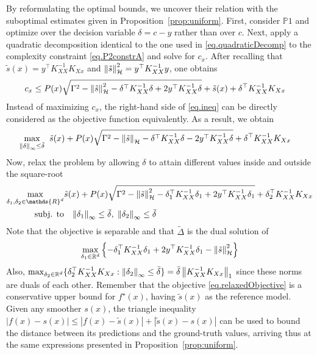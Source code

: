 By reformulating the optimal bounds, we uncover their relation with the suboptimal estimates given in Proposition~\ref{prop:uniform}. First, consider $\mathds{P}1$ and optimize over the decision variable $\delta = c - y$ rather than over $c$. Next, apply a quadratic decomposition identical to the one used in \eqref{eq.quadraticDecomp} to the complexity constraint \eqref{eq.P2constrA} and solve for $c_x$. After recalling that $\tilde{s}(x) = y^\top K_{XX}^{-1} K_{Xx}$ and $\left\| \tilde s \right\|_\mathcal{H}^2 = y^\top K_{XX}^{-1} y$, one obtains
\begin{equation}
	\begin{aligned}
		c_x  \leq \;&  P(x) \sqrt{ \Gamma^2 - \left\| \tilde s \right\|_\mathcal{H}^2 - \delta^\top K_{XX}^{-1}\delta +2y^\top K_{XX}^{-1}\delta} +\tilde s(x) 
		+ \delta^\top K_{XX}^{-1}K_{Xx}
	\end{aligned}	
	\label{eq.ineq}
\end{equation}
Instead of maximizing $c_x$, the right-hand side of \eqref{eq.ineq} can be directly considered as the objective function equivalently. As a result, we obtain 
\[
\begin{aligned}
	\max_{\left\| \delta \right\|_\infty \leq \bar \delta}\;\;& \tilde s(x) + P(x) \sqrt{ \Gamma^2 - \left\| \tilde s \right\|_\mathcal{H} - \delta^\top K_{XX}^{-1}\delta -2y^\top K_{XX}^{-1}\delta} + \delta^\top K_{XX}^{-1}K_{Xx} 
\end{aligned}
\]
Now, relax the problem by allowing $\delta$ to attain different values inside and outside the square-root
\begin{subequations}
	\begin{align}\notag
		\max_{\delta_1,\delta_2 \in \mathds{R}^{d}} &  \tilde s(x) + P(x) \sqrt{ \Gamma^2 - \rknorm{\tilde s}^2 - \delta_1^\top K_{XX}^{-1}\delta_1 +2y^\top K_{XX}^{-1}\delta_1} + \delta_2^\top K_{XX}^{-1}K_{Xx} \\ \label{eq.relaxedObjective}
		\text{\normalfont subj. to} & \;\; \; \infnorm{\delta_1} \leq \bar \delta, \; \infnorm{\delta_2} \leq \bar \delta 
	\end{align}
\end{subequations}
Note that the objective is separable and that $\tilde\Delta$ is the dual solution of 
\begin{equation}
	\max_{\delta_1 \in \mathbb{R}^d} \left\{ -\delta_1^\top K_{XX}^{-1}\delta_1 + 2y^\top K_{XX}^{-1}\delta_1 - \left\| \tilde s \right\|_\mathcal{H}^2 \right\}
\end{equation}
Also, $\max_{\delta_2 \in \mathbb{R}^d} \{ \delta_2^\top K_{XX}^{-1}K_{Xx} : \left\| \delta_2 \right\|_\infty \leq \bar\delta \} = \bar{\delta} \left\| K_{XX}^{-1}K_{Xx} \right\|_1$ since these norms are duals of each other. Remember that the objective \eqref{eq.relaxedObjective} is a conservative upper bound for $f^\star(x)$, having $\tilde s(x)$ as the reference model. Given any smoother $s(x)$, the triangle inequality $|f(x) - s(x)| \leq |f(x) - \tilde s(x)| + |\tilde s(x) - s(x)|$ can be used to bound the distance between its predictions and the ground-truth values, arriving thus at the same expressions presented in Proposition~\ref{prop:uniform}.

